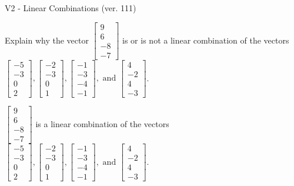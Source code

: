 \begin{exercise}
  \begin{exerciseTitle}V2 - Linear Combinations (ver. 111)\end{exerciseTitle}
  \begin{exerciseStatement}
    Explain why the vector \(\left[\begin{array}{c}
9 \\
6 \\
-8 \\
-7
\end{array}\right]\)  is or is not a linear 
	combination of the vectors \(\left[\begin{array}{c}
-5 \\
-3 \\
0 \\
2
\end{array}\right] , \left[\begin{array}{c}
-2 \\
-3 \\
0 \\
1
\end{array}\right] , \left[\begin{array}{c}
-1 \\
-3 \\
-4 \\
-1
\end{array}\right] , \text{ and } \left[\begin{array}{c}
4 \\
-2 \\
4 \\
-3
\end{array}\right]\).
	


  \end{exerciseStatement}
  \begin{exerciseAnswer}
   \(\left[\begin{array}{c}
9 \\
6 \\
-8 \\
-7
\end{array}\right]\) 
  	 is  
	a linear combination of the vectors \(\left[\begin{array}{c}
-5 \\
-3 \\
0 \\
2
\end{array}\right] , \left[\begin{array}{c}
-2 \\
-3 \\
0 \\
1
\end{array}\right] , \left[\begin{array}{c}
-1 \\
-3 \\
-4 \\
-1
\end{array}\right] , \text{ and } \left[\begin{array}{c}
4 \\
-2 \\
4 \\
-3
\end{array}\right]\).


\end{exerciseAnswer}
\end{exercise}
